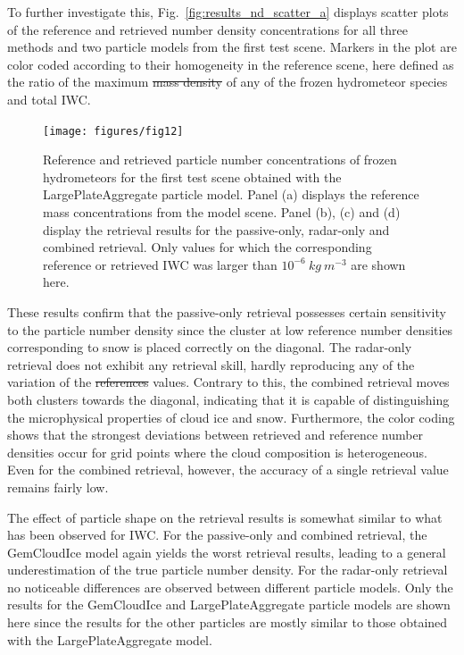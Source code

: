 \documentclass[journal abbreviation, manuscript]{copernicus}
\providecommand{\DIFadd}[1]{{\protect\color{blue}\uwave{#1}}} %
\providecommand{\DIFdel}[1]{{\protect\color{red}\sout{#1}}}                      %
\providecommand{\DIFaddbegin}{} %
\providecommand{\DIFaddend}{} %
\providecommand{\DIFdelbegin}{} %
\providecommand{\DIFdelend}{} %
\begin{document}
To further investigate this, Fig.~\ref{fig:results_nd_scatter_a} displays
scatter plots of the reference and retrieved number density concentrations for
all three methods and two particle models from the first test scene. Markers in
the plot are color coded according to their homogeneity in the reference scene,
here defined as the ratio of the maximum \DIFdelbegin \DIFdel{mass density }\DIFdelend \DIFaddbegin \DIFadd{water content }\DIFaddend of any of the frozen
hydrometeor species and total IWC. 

\begin{figure}
\centering
\texttt{[image: figures/fig12]}
\caption{Reference and retrieved particle number concentrations of frozen
  hydrometeors for the first test scene obtained with the LargePlateAggregate
  particle model. Panel (a) displays the reference mass concentrations from the
  model scene. Panel (b), (c) and (d) display the retrieval results for the
  passive-only, radar-only and combined retrieval. Only values for which the corresponding
  reference or retrieved IWC was larger than  $10^{-6}\ \unit{kg\ m^{-3}}$ are shown here.}
\label{fig:results_nd_a}
\end{figure}

These results confirm that the passive-only retrieval possesses certain
sensitivity to the particle number density since the cluster at low reference
number densities corresponding to snow is placed correctly on the diagonal. The
radar-only retrieval does not exhibit any retrieval skill, hardly reproducing
any of the variation of the \DIFdelbegin \DIFdel{references }\DIFdelend \DIFaddbegin \DIFadd{reference }\DIFaddend values. Contrary to this, the combined
retrieval moves both clusters towards the diagonal, indicating that it is
capable of distinguishing the microphysical properties of cloud ice and snow.
Furthermore, the color coding shows that the strongest deviations between
retrieved and reference number densities occur for grid points where the cloud
composition is heterogeneous. Even for the combined retrieval, however, the
accuracy of a single retrieval value remains fairly low.

The effect of particle shape on the retrieval results is somewhat similar to
what has been observed for IWC. For the passive-only and combined retrieval, the
GemCloudIce model again yields the worst retrieval results, leading to a general
underestimation of the true particle number density. For the radar-only
retrieval no noticeable differences are observed between different particle
models. Only the results for the GemCloudIce and LargePlateAggregate particle
models are shown here since the results for the other particles are mostly similar
to those obtained with the LargePlateAggregate model.
\end{document}
